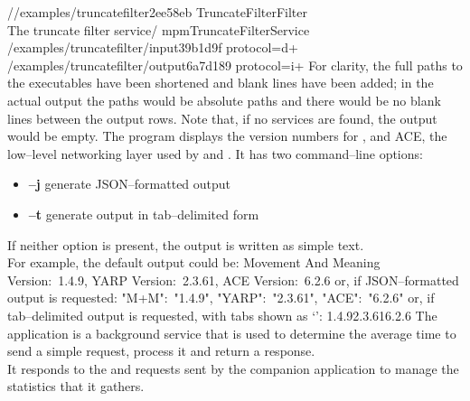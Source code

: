 /\serviceName/examples/truncatefilter\textunderscore{}2ee58eb\pseudotab{}%
TruncateFilter\pseudotab{}Filter\pseudotab\\
The truncate filter service\pseudotwotabs\textellipsis/%
mpmTruncateFilterService\pseudotab\\
/examples/truncatefilter/input\textunderscore{}39b1d9f\textbraceleft{}%
protocol=d+\textbraceright\pseudotab\\
/examples/truncatefilter/output\textunderscore{}6a7d189\textbraceleft{}%
protocol=i+\textbraceright
\outputEnd{}
For clarity, the full paths to the executables have been shortened and blank lines have
been added; in the actual output the paths would be absolute paths and there would be no
blank lines between the output rows.
Note that, if no services are found, the output would be empty.
The program  displays the version numbers for \mplusm{}, \yarp{}
and ACE, the low--level networking layer used by \mplusm{} and \yarp{}.
It has two command--line options:
\begin{itemize}
\item \textbf{--j} generate JSON--formatted output
\item \textbf{--t} generate output in tab--delimited form
\end{itemize}
If neither option is present, the output is written as simple text.\\

For example, the default output could be:
\outputBegin{}
Movement And Meaning Version:\ 1.4.9, YARP Version:\ 2.3.61, ACE Version:\ 6.2.6
\outputEnd{}
or, if JSON--formatted output is requested:
\outputBegin{}
\textbraceleft{} "M+M":\ "1.4.9", "YARP":\ "2.3.61", "ACE":\ "6.2.6" \textbraceright
\outputEnd{}
or, if tab--delimited output is requested, with tabs shown as
`\texttt{\boldmath{$\vdash$}}':
\outputBegin{}
1.4.9\pseudotab{}2.3.61\pseudotab{}6.2.6
\outputEnd{}
\secondaryEnd{}
\newpage
{}
The  application is a background service that is
used to determine the average time to send a simple request, process it and return a
response.\\

It responds to the  and
 requests sent by the
companion application  to manage the statistics
that it gathers.\\

